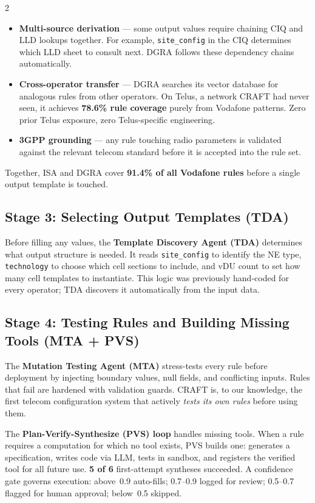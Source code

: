 \documentclass[10.5pt]{article}
\begin{document}
\begin{multicols}{2}
\begin{itemize}[leftmargin=1.1em,itemsep=2pt,topsep=2pt]
  \item \textbf{Multi-source derivation} --- some output values require chaining CIQ and LLD
  lookups together. For example, \texttt{site\_config} in the CIQ determines which LLD sheet to
  consult next. DGRA follows these dependency chains automatically.

  \item \textbf{Cross-operator transfer} --- DGRA searches its vector database for analogous rules
  from other operators. On Telus, a network CRAFT had never seen, it achieves \textbf{78.6\% rule
  coverage} purely from Vodafone patterns. Zero prior Telus exposure, zero Telus-specific
  engineering.

  \item \textbf{3GPP grounding} --- any rule touching radio parameters is validated against the
  relevant telecom standard before it is accepted into the rule set.

\end{itemize}

Together, ISA and DGRA cover \textbf{91.4\% of all Vodafone rules} before a single output
template is touched.

\subsection*{Stage 3: Selecting Output Templates (TDA)}

Before filling any values, the \textbf{Template Discovery Agent (TDA)} determines what output
structure is needed. It reads \texttt{site\_config} to identify the NE type, \texttt{technology}
to choose which cell sections to include, and vDU count to set how many cell templates to
instantiate. This logic was previously hand-coded for every operator; TDA discovers it
automatically from the input data.

\subsection*{Stage 4: Testing Rules and Building Missing Tools (MTA + PVS)}

The \textbf{Mutation Testing Agent (MTA)} stress-tests every rule before deployment by injecting
boundary values, null fields, and conflicting inputs. Rules that fail are hardened with validation
guards. CRAFT is, to our knowledge, the first telecom configuration system that actively
\emph{tests its own rules} before using them.

The \textbf{Plan-Verify-Synthesize (PVS) loop} handles missing tools. When a rule requires a
computation for which no tool exists, PVS builds one: generates a specification, writes code via
LLM, tests in sandbox, and registers the verified tool for all future use. \textbf{5 of 6}
first-attempt syntheses succeeded. A confidence gate governs execution: above~0.9 auto-fills;
0.7--0.9 logged for review; 0.5--0.7 flagged for human approval; below~0.5 skipped.


\end{multicols}
\end{document}
